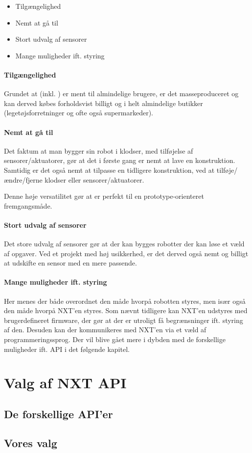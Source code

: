 \begin{itemize}
\item{Tilgængelighed}
\item{Nemt at gå til}
\item{Stort udvalg af sensorer}
\item{Mange muligheder ift. styring}
\end{itemize}

\paragraph{Tilgængelighed}
Grundet at \lego (inkl. \legoms) er ment til almindelige brugere, er det masseproduceret og kan derved købes forholdsvist billigt og i helt almindelige butikker (legetøjsforretninger og ofte også supermarkeder).

\paragraph{Nemt at gå til}
Det faktum at man bygger sin robot i \lego klodser, med tilføjelse af \legoms sensorer/aktuatorer, gør at det i første gang er nemt at lave en konstruktion.
Samtidig er det også nemt at tilpasse en tidligere konstruktion, ved at tilføje/ændre/fjerne klodser eller sensorer/aktuatorer.

Denne høje versatilitet gør at \lego er perfekt til en prototype-orienteret fremgangsmåde.

\paragraph{Stort udvalg af sensorer}
Det store udvalg af sensorer gør at der kan bygges robotter der kan løse et væld af opgaver.
Ved et projekt med høj usikkerhed, er det derved også nemt og billigt at udskifte en sensor med en mere passende.

\paragraph{Mange muligheder ift. styring}
Her menes der både overordnet den måde hvorpå robotten styres, men især også den måde hvorpå NXT'en styres.
Som nævnt tidligere kan NXT'en udstyres med brugerdefineret firmware, der gør at der er utroligt få begrænsninger ift. styring af den.
Desuden kan der kommunikeres med NXT'en via et væld af programmeringssprog.
Der vil blive gået mere i dybden med de forskellige muligheder ift. API i det følgende kapitel.


\section{Valg af NXT API}
\label{nxt_api}

\subsection{De forskellige API'er}

\subsection{Vores valg}

